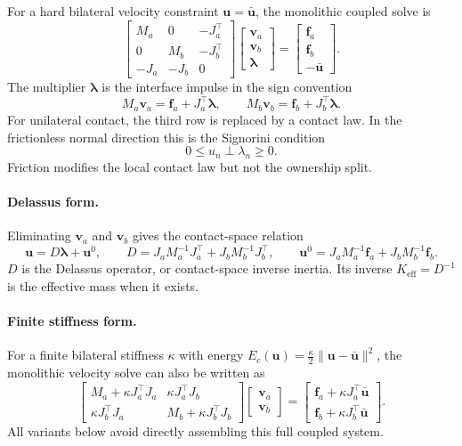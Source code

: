 \documentclass[11pt]{article}
\newcommand{\va}{\bm v_a}
\newcommand{\vb}{\bm v_b}
\newcommand{\uu}{\bm u}
\newcommand{\ubar}{\bar{\bm u}}
\newcommand{\fa}{\bm f_a}
\newcommand{\fb}{\bm f_b}
\newcommand{\lam}{\bm\lambda}
\newcommand{\Ja}{J_a}
\newcommand{\Jb}{J_b}
\newcommand{\Ma}{M_a}
\newcommand{\Mb}{M_b}
\newcommand{\Dop}{D}
\newcommand{\Keff}{K_{\mathrm{eff}}}
\begin{document}
For a hard bilateral velocity constraint $\uu=\ubar$, the monolithic coupled solve is
\begin{equation}
\begin{bmatrix}
\Ma & 0 & -\Ja^\top \\
0 & \Mb & -\Jb^\top \\
-\Ja & -\Jb & 0
\end{bmatrix}
\begin{bmatrix}
\va \\ \vb \\ \lam
\end{bmatrix}
=
\begin{bmatrix}
\fa \\ \fb \\ -\ubar
\end{bmatrix}.
\label{eq:global-kkt}
\end{equation}
The multiplier $\lam$ is the interface impulse in the sign convention
\[
    \Ma\va = \fa + \Ja^\top\lam,\qquad
    \Mb\vb = \fb + \Jb^\top\lam .
\]
For unilateral contact, the third row is replaced by a contact law. In the frictionless
normal direction this is the Signorini condition
\[
    0 \leq u_n \perp \lambda_n \geq 0 .
\]
Friction modifies the local contact law but not the ownership split.

\paragraph{Delassus form.}
Eliminating $\va$ and $\vb$ gives the contact-space relation
\begin{equation}
    \uu = \Dop\lam + \uu^0,\qquad
    \Dop =
        \Ja\Ma^{-1}\Ja^\top
      + \Jb\Mb^{-1}\Jb^\top,\qquad
    \uu^0 =
        \Ja\Ma^{-1}\fa
      + \Jb\Mb^{-1}\fb .
    \label{eq:delassus}
\end{equation}
$\Dop$ is the Delassus operator, or contact-space inverse inertia. Its inverse
$\Keff=\Dop^{-1}$ is the effective mass when it exists.

\paragraph{Finite stiffness form.}
For a finite bilateral stiffness $\kappa$ with energy
$E_c(\uu)=\frac{\kappa}{2}\|\uu-\ubar\|^2$, the monolithic velocity solve can also be
written as
\begin{equation}
\begin{bmatrix}
\Ma + \kappa\Ja^\top\Ja & \kappa\Ja^\top\Jb \\
\kappa\Jb^\top\Ja & \Mb + \kappa\Jb^\top\Jb
\end{bmatrix}
\begin{bmatrix}
\va \\ \vb
\end{bmatrix}
=
\begin{bmatrix}
\fa + \kappa\Ja^\top\ubar \\
\fb + \kappa\Jb^\top\ubar
\end{bmatrix}.
\label{eq:stiffness}
\end{equation}
All variants below avoid directly assembling this full coupled system.
\end{document}
